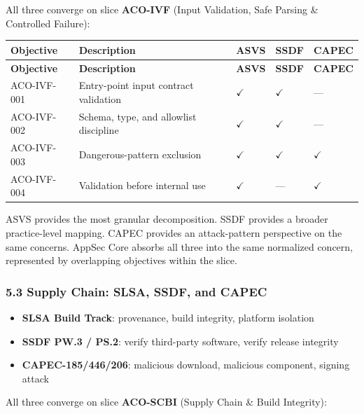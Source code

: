 \documentclass[
]{article}
\providecommand{\tightlist}{%
  \setlength{\itemsep}{0pt}\setlength{\parskip}{0pt}}
\begin{document}
All three converge on slice \textbf{ACO-IVF} (Input Validation, Safe
Parsing \& Controlled Failure):

\begin{longtable}{@{}L{2.25cm}L{7.2cm}C{1cm}C{1cm}C{1cm}@{}}
\toprule
\textbf{Objective} & \textbf{Description} & \textbf{ASVS} & \textbf{SSDF} & \textbf{CAPEC} \\
\midrule
\endfirsthead
\toprule
\textbf{Objective} & \textbf{Description} & \textbf{ASVS} & \textbf{SSDF} & \textbf{CAPEC} \\
\midrule
\endhead
\bottomrule
\endfoot
\bottomrule
\endlastfoot
ACO-IVF-001 & Entry-point input contract validation & $\checkmark$ & $\checkmark$ & --- \\
ACO-IVF-002 & Schema, type, and allowlist discipline & $\checkmark$ & $\checkmark$ & --- \\
ACO-IVF-003 & Dangerous-pattern exclusion & $\checkmark$ & $\checkmark$ & $\checkmark$ \\
ACO-IVF-004 & Validation before internal use & $\checkmark$ & --- & $\checkmark$ \\
\end{longtable}

ASVS provides the most granular decomposition. SSDF provides a broader
practice-level mapping. CAPEC provides an attack-pattern perspective on
the same concerns. AppSec Core absorbs all three into the same
normalized concern, represented by overlapping objectives within the
slice.

\subsubsection{5.3 Supply Chain: SLSA, SSDF, and
CAPEC}\label{supply-chain-slsa-ssdf-and-capec}

\begin{itemize}
\tightlist
\item
  \textbf{SLSA Build Track}: provenance, build integrity, platform
  isolation
\item
  \textbf{SSDF PW.3 / PS.2}: verify third-party software, verify release
  integrity
\item
  \textbf{CAPEC-185/446/206}: malicious download, malicious component,
  signing attack
\end{itemize}

All three converge on slice \textbf{ACO-SCBI} (Supply Chain \& Build
Integrity):
\end{document}
